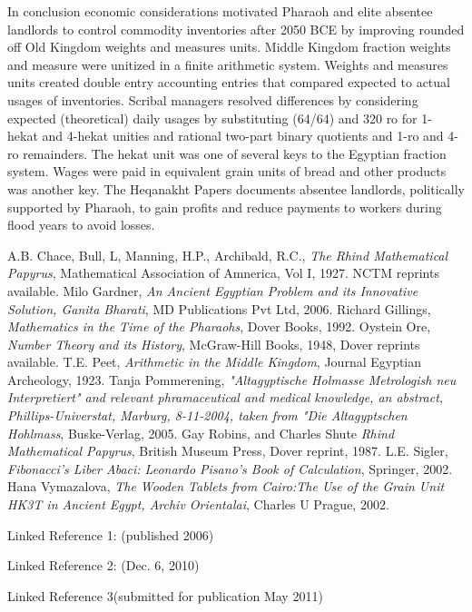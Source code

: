 \documentclass[12pt]{article}
\begin{document}
In conclusion economic considerations motivated Pharaoh and elite absentee landlords to control commodity inventories after 2050 BCE by improving rounded off Old Kingdom weights and measures units. Middle Kingdom fraction weights and measure were unitized in a finite arithmetic system. Weights and measures units created double entry accounting entries that compared expected to actual usages of inventories. Scribal managers resolved differences by considering expected (theoretical) daily usages by substituting (64/64) and 320 ro for 1- hekat  and 4-hekat unities and rational two-part binary quotients and 1-ro and 4-ro remainders. The hekat unit was one of several keys to the Egyptian fraction system. Wages were paid in equivalent grain units of bread and other products was another key. The Heqanakht Papers documents absentee landlords, politically supported by Pharaoh, to gain profits and reduce payments to workers during flood years to avoid losses.

\begin{thebibliography}{9}
  A.B. Chace, Bull, L, Manning, H.P., Archibald, R.C., \emph{The Rhind Mathematical Papyrus}, Mathematical Association of Amnerica, Vol I, 1927. NCTM reprints available.
 Milo Gardner, \emph{An Ancient Egyptian Problem and its Innovative Solution, Ganita Bharati}, MD Publications Pvt Ltd, 2006.
Richard Gillings, \emph{Mathematics in the Time of the Pharaohs}, Dover Books, 1992.
 Oystein Ore, \emph{Number Theory and its History}, McGraw-Hill Books, 1948, Dover reprints available.
 T.E. Peet, \emph{Arithmetic in the Middle Kingdom}, Journal Egyptian Archeology, 1923.
 Tanja Pommerening, \emph{"Altagyptische Holmasse Metrologish neu Interpretiert" and relevant phramaceutical and medical knowledge, an abstract,  Phillips-Universtat, Marburg, 8-11-2004, taken from "Die Altagyptschen Hohlmass}, Buske-Verlag, 2005.
 Gay Robins, and Charles Shute \emph{Rhind Mathematical Papyrus}, British Museum Press, Dover reprint, 1987.
 L.E. Sigler, \emph{Fibonacci's Liber Abaci: Leonardo Pisano's Book of Calculation}, Springer, 2002.
 Hana Vymazalova, \emph{The Wooden Tablets from Cairo:The Use of the Grain Unit HK3T in Ancient Egypt, Archiv Orientalai}, Charles U Prague, 2002.
\end{thebibliography}




Linked Reference 1: (published 2006)

Linked Reference 2: (Dec. 6, 2010)

Linked Reference 3(submitted for publication May 2011)

\end{document}
